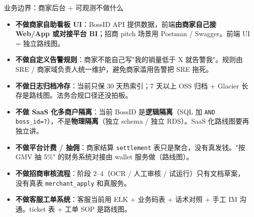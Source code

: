 \documentclass[aspectratio=169,11pt]{beamer}
\begin{document}
\begin{frame}[shrink]{业务边界：商家后台 + 可观测不做什么}
\begin{itemize}
  \item \textbf{不做商家自助看板 UI}：BossID API 提供数据，前端\textbf{由商家自己接 Web/App 或对接平台 BI}；招商 pitch 场景用 Postman / Swagger。前端 UI = 独立路线图。
  \item \textbf{不做自定义告警规则}：商家不能自己写"我的销量低于 X 就告警我"。规则由 SRE / 商家域负责人统一维护，避免商家滥用告警把 SRE 拖死。
  \item \textbf{不做日志归档冷存}：当前只保 30 天热索引；7 天以上 OSS 归档 + Glacier 长存是路线图。法务合规口径还没拍板。
  \item \textbf{不做 SaaS 化多商户隔离}：当前 BossID 是\textbf{逻辑隔离}（SQL 加 \texttt{AND boss\_id=?}），不是\textbf{物理隔离}（独立 schema / 独立 RDS）。SaaS 化路线图要再独立讲。
  \item \textbf{不做平台计费 / 抽佣}：商家结算 \texttt{settlement} 表只是聚合，没有真发钱。"按 GMV 抽 5\%" 的财务系统对接由 wallet 服务做（路线图）。
  \item \textbf{不做招商审核流程}：阶段 2--4（OCR / 人工审核 / 试运行）只有文档草案，没有真表 \texttt{merchant\_apply} 和真服务。
  \item \textbf{不做客服工单系统}：客服当前用 ELK + 业务码表 + 话术对照 + 手工 IM 沟通。ticket 表 + 工单 SOP 是路线图。
\end{itemize}
\end{frame}
\end{document}
